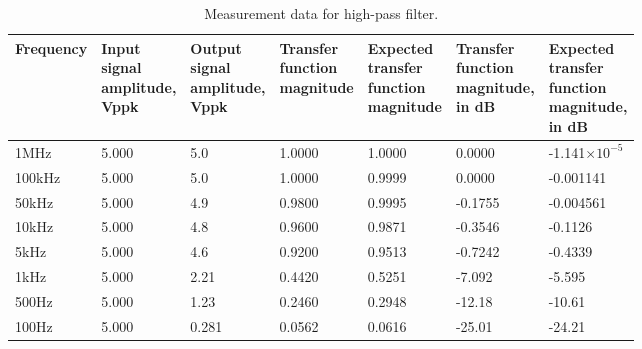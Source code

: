 \begin{table}[H]
	\centering
	\begin{tabular}{|l|l|l|l|l|l|l|}
	\hline
	Frequency&\makecell[l]{Input\\signal\\amplitude,\\Vppk}&\makecell[l]{Output\\signal\\amplitude,\\Vppk}&\makecell[l]{Transfer\\function\\magnitude}&\makecell[l]{Expected\\transfer\\function\\magnitude}&\makecell[l]{Transfer\\function\\magnitude,\\in dB}&\makecell[l]{Expected\\transfer\\function\\magnitude,\\in dB}\\
	\hline
	1MHz&5.000&5.0&1.0000&1.0000&0.0000&-1.141$\times10^{-5}$\\
	\hline
	100kHz&5.000&5.0&1.0000&0.9999&0.0000&-0.001141\\
	\hline
	50kHz&5.000&4.9&0.9800&0.9995&-0.1755&-0.004561\\
	\hline
	10kHz&5.000&4.8&0.9600&0.9871&-0.3546&-0.1126\\
	\hline
	5kHz&5.000&4.6&0.9200&0.9513&-0.7242&-0.4339\\
	\hline
	1kHz&5.000&2.21&0.4420&0.5251&-7.092&-5.595\\
	\hline
	500Hz&5.000&1.23&0.2460&0.2948&-12.18&-10.61\\
	\hline
	100Hz&5.000&0.281&0.0562&0.0616&-25.01&-24.21\\
	\hline
	\end{tabular}
	\caption{Measurement data for high-pass filter.}
\end{table}
